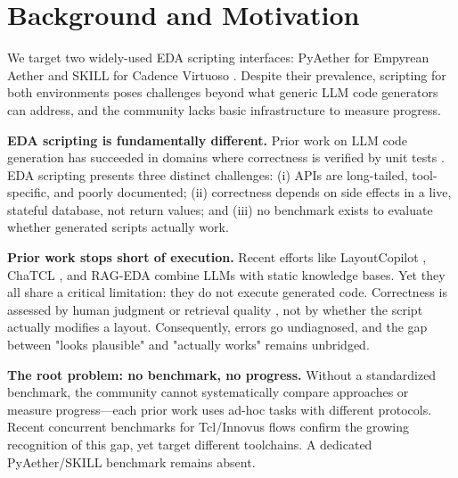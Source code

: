 \section{Background and Motivation}
\label{sec:background}

We target two widely-used EDA scripting interfaces: PyAether for Empyrean Aether \cite{empyrean_pyaether} and SKILL for Cadence Virtuoso \cite{cadence2024virtuoso}. Despite their prevalence, scripting for both environments poses challenges beyond what generic LLM code generators can address, and the community lacks basic infrastructure to measure progress.

\textbf{EDA scripting is fundamentally different.} Prior work on LLM code generation has succeeded in domains where correctness is verified by unit tests \cite{chen2021evaluating, austin2021program}. EDA scripting presents three distinct challenges: (i) APIs are long-tailed, tool-specific, and poorly documented; (ii) correctness depends on side effects in a live, stateful database, not return values; and (iii) no benchmark exists to evaluate whether generated scripts actually work.

\textbf{Prior work stops short of execution.} Recent efforts like LayoutCopilot \cite{liu2025layoutcopilot}, ChaTCL \cite{rui2025chatcl}, and RAG-EDA \cite{pu2024rag} combine LLMs with static knowledge bases. Yet they all share a critical limitation: they do not execute generated code. Correctness is assessed by human judgment \cite{liu2025layoutcopilot, rui2025chatcl} or retrieval quality \cite{pu2024rag}, not by whether the script actually modifies a layout. Consequently, errors go undiagnosed, and the gap between "looks plausible" and "actually works" remains unbridged.

\textbf{The root problem: no benchmark, no progress.} Without a standardized benchmark, the community cannot systematically compare approaches or measure progress—each prior work uses ad-hoc tasks with different protocols. Recent concurrent benchmarks for Tcl/Innovus flows \cite{xu2026iscript, li2026pdagent} confirm the growing recognition of this gap, yet target different toolchains. A dedicated PyAether/SKILL benchmark remains absent.

